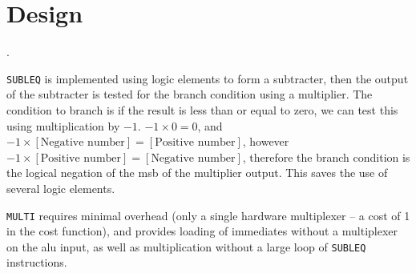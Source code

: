 \section{ Design} \label{sec:alu-design}.

\texttt{SUBLEQ} is implemented using logic elements to form a subtracter, then the output of the subtracter is tested for the branch condition using a multiplier. The condition to branch is if the result is less than or equal to zero, we can test this using multiplication by $-1$. $-1 \times 0 = 0$, and $-1 \times [\text{Negative number}] = [\text{Positive number}]$, however $-1 \times [\text{Positive number}] = [\text{Negative number}]$, therefore the branch condition is the logical negation of the \gls{msb} of the multiplier output. This saves the use of several logic elements.

\texttt{MULTI} requires minimal overhead (only a single hardware multiplexer -- a cost of 1 in the cost function), and provides loading of immediates without a multiplexer on the \gls{alu} input, as well as multiplication without a large loop of \texttt{SUBLEQ} instructions.

